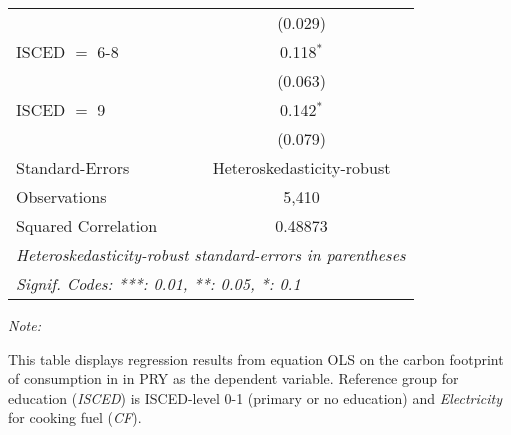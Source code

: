 \begin{table}[htbp!]
\begin{adjustbox}{width = 1\textwidth, max height = 0.95\textheight, center}
\begin{threeparttable}[b]
\begin{tabular}{lc}
                                & (0.029)\\   
            ISCED $=$ 6-8       & 0.118$^{*}$\\   
                                & (0.063)\\   
            ISCED $=$ 9         & 0.142$^{*}$\\   
                                & (0.079)\\   
            \midrule 
            Standard-Errors     & Heteroskedasticity-robust \\   
            Observations        & 5,410\\  
            Squared Correlation & 0.48873\\  
            \midrule \midrule
            \multicolumn{2}{l}{\emph{Heteroskedasticity-robust standard-errors in parentheses}}\\
            \multicolumn{2}{l}{\emph{Signif. Codes: ***: 0.01, **: 0.05, *: 0.1}}\\
         \end{tabular}
         
         \begin{tablenotes}\item \medskip \textit{Note:}
            \item This table displays regression results from equation OLS on the carbon footprint of consumption in  in PRY as the dependent variable.  Reference group for education (\textit{ISCED}) is ISCED-level 0-1 (primary or no education) and \textit{Electricity} for cooking fuel (\textit{CF}).
         \end{tablenotes}
      \end{threeparttable}
   \end{adjustbox}
\end{table}


